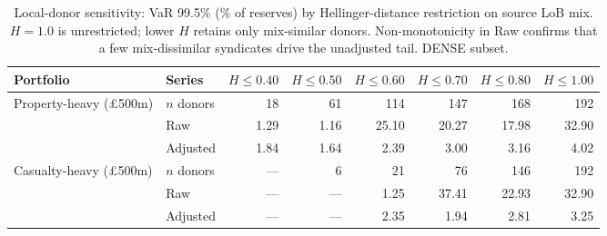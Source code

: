 \begin{table}[htbp]
\centering
\caption{Local-donor sensitivity: VaR 99.5\% (\% of reserves) by Hellinger-distance restriction on source LoB mix.  $H=1.0$ is unrestricted; lower $H$ retains only mix-similar donors.  Non-monotonicity in Raw confirms that a few mix-dissimilar syndicates drive the unadjusted tail.  DENSE subset.}
\label{tab:local_donor}
\begin{tabular}{llrrrrrr}
\toprule
Portfolio & Series & $H \leq 0.40$ & $H \leq 0.50$ & $H \leq 0.60$ & $H \leq 0.70$ & $H \leq 0.80$ & $H \leq 1.00$ \\
\midrule
Property-heavy (\pounds 500m) & $n$ donors & 18 & 61 & 114 & 147 & 168 & 192 \\
 & Raw & 1.29 & 1.16 & 25.10 & 20.27 & 17.98 & 32.90 \\
 & Adjusted & 1.84 & 1.64 & 2.39 & 3.00 & 3.16 & 4.02 \\
\addlinespace
Casualty-heavy (\pounds 500m) & $n$ donors & --- & 6 & 21 & 76 & 146 & 192 \\
 & Raw & --- & --- & 1.25 & 37.41 & 22.93 & 32.90 \\
 & Adjusted & --- & --- & 2.35 & 1.94 & 2.81 & 3.25 \\
\bottomrule
\end{tabular}
\end{table}